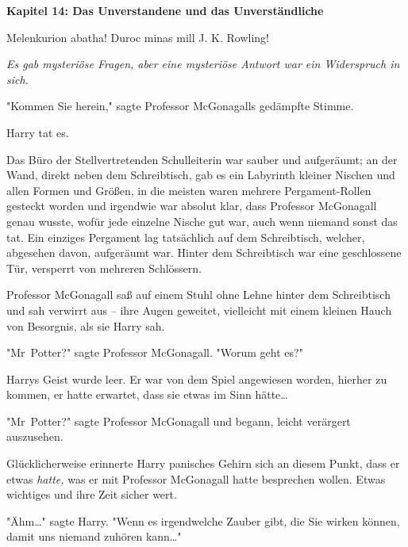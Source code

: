 

\hypertarget{das-unverstandene-und-das-unverstuxe4ndliche}{%

\textbf{Kapitel 14: Das Unverstandene und das Unverständliche}

Melenkurion abatha! Duroc minas mill J. K. Rowling!

\later

\emph{Es gab mysteriöse Fragen, aber eine mysteriöse Antwort war ein Widerspruch in sich.}

\later

"Kommen Sie herein," sagte Professor McGonagalls gedämpfte Stimme.

Harry tat es.

Das Büro der Stellvertretenden Schulleiterin war sauber und aufgeräumt; an der Wand, direkt neben dem Schreibtisch, gab es ein Labyrinth kleiner Nischen und allen Formen und Größen, in die meisten waren mehrere Pergament-Rollen gesteckt worden und irgendwie war absolut klar, dass Professor McGonagall genau wusste, wofür jede einzelne Nische gut war, auch wenn niemand sonst das tat. Ein einziges Pergament lag tatsächlich auf dem Schreibtisch, welcher, abgesehen davon, aufgeräumt war. Hinter dem Schreibtisch war eine geschlossene Tür, versperrt von mehreren Schlössern.

Professor McGonagall saß auf einem Stuhl ohne Lehne hinter dem Schreibtisch und sah verwirrt aus -- ihre Augen geweitet, vielleicht mit einem kleinen Hauch von Besorgnis, als sie Harry sah.

"Mr~Potter?" sagte Professor McGonagall. "Worum geht es?"

Harrys Geist wurde leer. Er war von dem Spiel angewiesen worden, hierher zu kommen, er hatte erwartet, dass sie etwas im Sinn hätte…

"Mr~Potter?" sagte Professor McGonagall und begann, leicht verärgert auszusehen.

Glücklicherweise erinnerte Harry panisches Gehirn sich an diesem Punkt, dass er etwas \emph{hatte,} was er mit Professor McGonagall hatte besprechen wollen. Etwas wichtiges und ihre Zeit sicher wert.

"Ähm…" sagte Harry. "Wenn es irgendwelche Zauber gibt, die Sie wirken können, damit uns niemand zuhören kann…"

}
